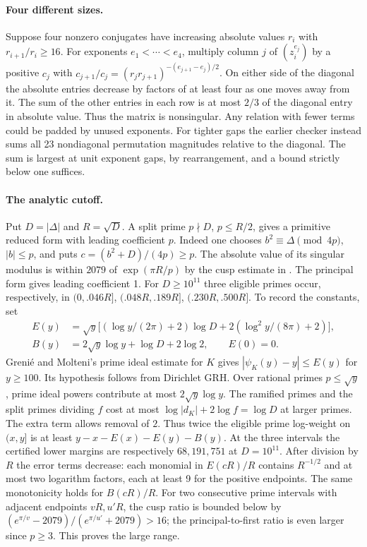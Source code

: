 \paragraph{Four different sizes.}
Suppose four nonzero conjugates have increasing absolute values $r_i$ with $r_{i+1}/r_i\ge16$. For exponents $e_1<\cdots<e_4$, multiply column $j$ of $(z_i^{e_j})$ by a positive $c_j$ with $c_{j+1}/c_j=(r_jr_{j+1})^{-(e_{j+1}-e_j)/2}$. On either side of the diagonal the absolute entries decrease by factors of at least four as one moves away from it. The sum of the other entries in each row is at most $2/3$ of the diagonal entry in absolute value. Thus the matrix is nonsingular. Any relation with fewer terms could be padded by unused exponents. For tighter gaps the earlier checker instead sums all 23 nondiagonal permutation magnitudes relative to the diagonal. The sum is largest at unit exponent gaps, by rearrangement, and a bound strictly below one suffices.

\paragraph{The analytic cutoff.}
Put $D=|\Delta|$ and $R=\sqrt D$. A split prime $p\nmid D$, $p\le R/2$, gives a primitive reduced form with leading coefficient $p$. Indeed one chooses $b^2\equiv\Delta\pmod{4p}$, $|b|\le p$, and puts $c=(b^2+D)/(4p)\ge p$. The absolute value of its singular modulus is within $2079$ of $\exp(\pi R/p)$ by the cusp estimate in \cite{riffaut}. The principal form gives leading coefficient 1. For $D\ge10^{11}$ three eligible primes occur, respectively, in $(0,.046R]$, $(.048R,.189R]$, $(.230R,.500R]$. To record the constants, set
\[
 \begin{split}
 E(y)&=\sqrt y\big[(\log y/(2\pi)+2)\log D+2(\log^2 y/(8\pi)+2)\big],\\
 B(y)&=2\sqrt y\log y+\log D+2\log 2,\qquad E(0)=0 .
 \end{split}
\]
Greni\'e and Molteni's prime ideal estimate for $K$ gives $|\psi_K(y)-y|\le E(y)$ for $y\ge100$. Its hypothesis follows from Dirichlet GRH. Over rational primes $p\le\sqrt y$, prime ideal powers contribute at most $2\sqrt y\log y$. The ramified primes and the split primes dividing $f$ cost at most $\log|d_K|+2\log f=\log D$ at larger primes. The extra term allows removal of $2$. Thus twice the eligible prime log-weight on $(x,y]$ is at least $y-x-E(x)-E(y)-B(y)$. At the three intervals the certified lower margins are respectively $68,191,751$ at $D=10^{11}$. After division by $R$ the error terms decrease: each monomial in $E(cR)/R$ contains $R^{-1/2}$ and at most two logarithm factors, each at least 9 for the positive endpoints. The same monotonicity holds for $B(cR)/R$. For two consecutive prime intervals with adjacent endpoints $vR,u'R$, the cusp ratio is bounded below by $(e^{\pi/v}-2079)/(e^{\pi/u'}+2079)>16$; the principal-to-first ratio is even larger since $p\ge3$. This proves the large range.\cite{gm,prior}

